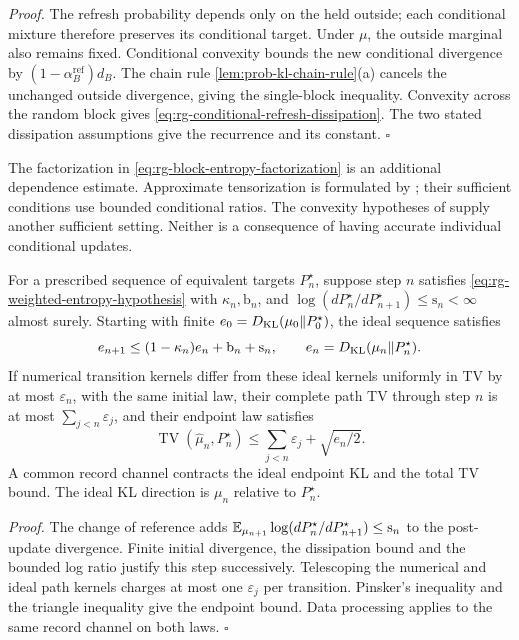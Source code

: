\noindent\emph{Proof.}
The refresh probability depends only on the held outside; each conditional
mixture therefore preserves its conditional target. Under $\mu$, the
outside marginal also remains fixed. Conditional convexity bounds the
new conditional divergence by
$(1-\alpha^{\mathrm{ref}}_B)d_B$. The chain rule
\cref{lem:prob-kl-chain-rule}(a) cancels the unchanged outside divergence,
giving the single-block inequality. Convexity across the random block
gives \eqref{eq:rg-conditional-refresh-dissipation}. The two stated
dissipation assumptions give the recurrence and its constant.
\hfill$\square$

The factorization in \eqref{eq:rg-block-entropy-factorization} is an
additional dependence estimate. Approximate tensorization is formulated
by \citet[Eq.~(1.4), Prop.~1.1]{CaputoMenzTetali2015}; their sufficient
conditions use bounded conditional ratios. The convexity hypotheses of
\citet[Thms.~3.1--3.2]{AscolaniLavenantZanella2024} supply another
sufficient setting. Neither is a consequence of having accurate
individual conditional updates.

For a prescribed sequence of equivalent targets $P^\star_n$, suppose
step $n$ satisfies \eqref{eq:rg-weighted-entropy-hypothesis} with
$\kappa_n,\mathrm b_n$, and
$\log(dP^\star_n/dP^\star_{n+1})\leq\mathrm s_n<\infty$ almost surely.
Starting with finite $e_0=D_{\mathrm{KL}}(\mu_0\Vert P^\star_0)$, the ideal sequence
satisfies
\begin{equation}
e_{n+1}\leq(1-\kappa_n)e_n+\mathrm b_n+\mathrm s_n,
\qquad e_n=D_{\mathrm{KL}}(\mu_n\Vert P^\star_n).
\label{eq:rg-refresh-moving-target}
\end{equation}
If numerical transition kernels differ from these ideal kernels uniformly
in TV by at most $\varepsilon_n$, with the same initial law, their
complete path TV through step $n$ is at most
$\sum_{j<n}\varepsilon_j$, and their endpoint law satisfies
\begin{equation}
\operatorname{TV}(\widehat\mu_n,P^\star_n)
\leq\sum_{j<n}\varepsilon_j+\sqrt{e_n/2}.
\label{eq:rg-refresh-numerical-transfer}
\end{equation}
A common record channel contracts the ideal endpoint KL and the total TV
bound. The ideal KL direction is $\mu_n$ relative to $P^\star_n$.

\noindent\emph{Proof.}
The change of reference adds
$\mathbb E_{\mu_{n+1}}\log(dP^\star_n/dP^\star_{n+1})\leq\mathrm s_n$
to the post-update divergence. Finite initial divergence, the dissipation
bound and the bounded log ratio justify this step successively.
Telescoping the numerical and ideal path kernels charges at most one
$\varepsilon_j$ per transition. Pinsker's inequality and the triangle
inequality give the endpoint bound. Data processing applies to the same
record channel on both laws. \hfill$\square$

